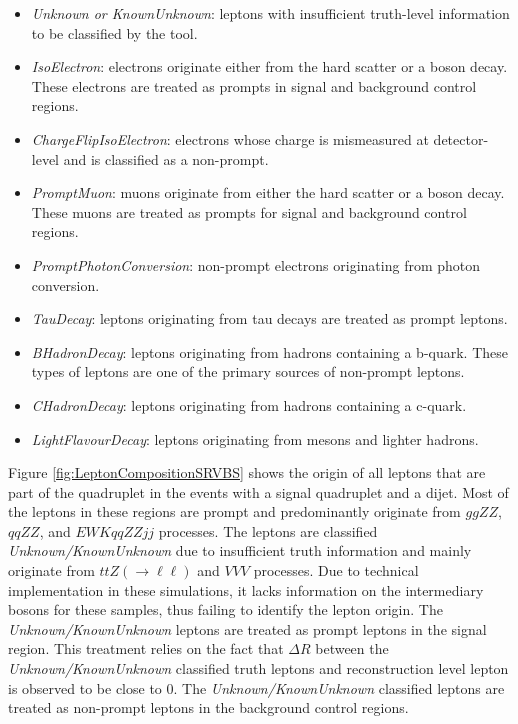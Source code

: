 \begin{itemize}
    \item{ \textit{Unknown or KnownUnknown}: leptons with insufficient truth-level information to be classified by the tool.}
 
    \item { \textit{IsoElectron}: electrons originate either from the hard scatter or a boson decay. These electrons are treated as prompts in signal and background control regions.}
    
    \item{ \textit{ChargeFlipIsoElectron}: electrons whose charge is mismeasured at detector-level and is classified as a non-prompt.}
    
    \item{ \textit{PromptMuon}: muons originate from either the hard scatter or a boson decay. These muons are treated as prompts for signal and background control regions.}
    
    \item{\textit{PromptPhotonConversion}: non-prompt electrons originating from photon conversion. }
    
    \item{\textit{TauDecay}: leptons originating from tau decays are treated as prompt leptons.}
    
    \item{\textit{BHadronDecay}: leptons originating from hadrons containing a b-quark. These types of leptons are one of the primary sources of non-prompt leptons.}
    
    \item{\textit{CHadronDecay}: leptons originating from hadrons containing a c-quark.}
    
    \item{\textit{LightFlavourDecay}: leptons originating from mesons and lighter hadrons.}

\end{itemize}

Figure \ref{fig:LeptonCompositionSRVBS} shows the origin of all leptons that are part of the quadruplet in the events with a signal quadruplet and a dijet. Most of the leptons in these regions are prompt and predominantly originate from $ggZZ$, $qqZZ$, and $ EWK qqZZjj$ processes. The leptons are classified \textit{Unknown/KnownUnknown} due to insufficient truth information and mainly originate from $ttZ(\rightarrow \ell \ell)$ and $VVV$ processes. Due to technical implementation in these simulations, it lacks information on the intermediary bosons for these samples, thus failing to identify the lepton origin. The \textit{Unknown/KnownUnknown} leptons are treated as prompt leptons in the signal region. This treatment relies on the fact that $\Delta R$ between the \textit{Unknown/KnownUnknown} classified truth leptons and reconstruction level lepton is observed to be close to $0$. The \textit{Unknown/KnownUnknown} classified leptons are treated as non-prompt leptons in the background control regions. 

